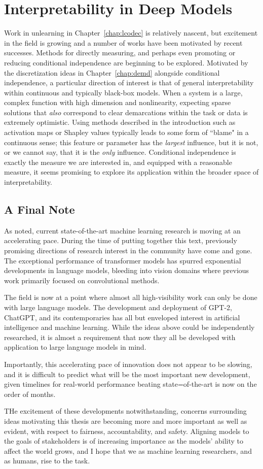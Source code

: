 \section{Interpretability in Deep Models}\label{sec:latents}
Work in unlearning in Chapter~\ref{chap:lcodec} is relatively nascent,
but excitement in the field is growing
and a number of works have been motivated
by recent successes.
Methods for directly measuring, and perhaps
even promoting or reducing conditional
independence are beginning to be explored.
Motivated by the discretization ideas
in Chapter~\ref{chap:demd} alongside
conditional independence,
a particular direction of interest
is that of general interpretability 
within continuous and typically
black-box models.
When a system is a large,
complex function with high dimension
and nonlinearity,
expecting sparse solutions
that \textit{also} correspond
to clear demarcations within the task or 
data is extremely optimistic.
Using methods described in the introduction
such as activation maps
or Shapley values typically 
leads to some form of ``blame"
in a continuous sense;
this feature or parameter
has the \textit{largest} influence,
but it is not, or we cannot say,
that it is the \textit{only} influence.
Conditional independence is exactly
the measure we are interested in,
and equipped with a reasonable measure,
it seems promising to explore its
application within the broader space of
interpretability.

\subsection{A Final Note}
As noted, current state-of-the-art
machine learning research
is moving at an accelerating pace.
During the time of putting
together this text,
previously promising directions
of research interest in the community
have come and gone.
The exceptional performance
of transformer models
has spurred exponential developments
in language models,
bleeding into vision domains
where previous work primarily
focused on convolutional methods.

The field is now at a point
where almost all high-visibility
work can only be done
with large language models.
The development and deployment
of GPT-2, ChatGPT, and its contemporaries
has all but enveloped interest
in artificial intelligence and machine learning.
While the ideas above could be independently
researched,
it is almost a requirement that now they 
all be developed with application to large
language models in mind.

Importantly, this accelerating pace
of innovation does not appear to be slowing,
and it is difficult to predict
what will be the most important
new development, given timelines
for real-world performance beating
state=of-the-art is now on the order of months.

THe excitement of these developments notwithstanding,
concerns surrounding ideas motivating this thesis
are becoming more and more important as well
as evident, with respect to fairness,
accountability, and safety.
Aligning models to the goals of stakeholders
is of increasing importance as the models'
ability to affect the world grows,
and I hope that we as machine learning
researchers, and as humans, rise to the task.